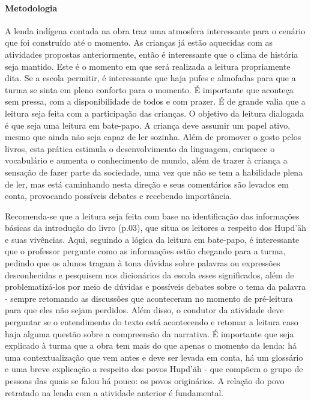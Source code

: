 \documentclass[11pt]{extarticle}
\begin{document}
\paragraph{Metodologia} A lenda indígena contada na obra traz uma atmosfera interessante para o cenário que foi construído até o momento. As crianças já estão aquecidas com as atividades propostas anteriormente, então é interessante que o clima de história seja mantido. Este é o momento em que será realizada a leitura propriamente dita. Se a escola permitir, é interessante que haja pufes e almofadas para que a turma se sinta em pleno conforto para o momento. É importante que aconteça sem pressa, com a disponibilidade de todos e com prazer. É de grande valia que a leitura seja feita com a participação das crianças. O objetivo da leitura dialogada é que seja uma leitura em bate-papo. A criança deve assumir um papel ativo, mesmo que ainda não seja capaz de ler sozinha. Além de promover o gosto pelos livros, esta prática estimula o desenvolvimento da linguagem, enriquece o vocabulário e aumenta o conhecimento de mundo, além de trazer à criança a sensação de fazer parte da sociedade, uma vez que não se tem a habilidade plena de ler, mas está caminhando nesta direção e seus comentários são levados em conta, provocando possíveis debates e recebendo importância. 



Recomenda-se que a leitura seja feita com base na identificação das informações básicas da introdução do livro (p.03), que situa os leitores a respeito dos Hupd'äh e suas vivências. Aqui, seguindo a lógica da leitura em bate-papo, é interessante que o professor pergunte como as informações estão chegando para a turma, pedindo que os alunos tragam à tona dúvidas sobre palavras ou expressões desconhecidas e pesquisem nos dicionários da escola esses significados, além de problematizá-los por meio de dúvidas e possíveis debates sobre o tema da palavra - sempre retomando as discussões que aconteceram no momento de pré-leitura para que eles não sejam perdidos. Além disso, o condutor da atividade deve perguntar se o entendimento do texto está acontecendo e retomar a leitura caso haja alguma questão sobre a compreensão da narrativa. É importante que seja explicado à turma que a obra tem mais do que apenas o momento da lenda: há uma contextualização que vem antes e deve ser levada em conta, há um glossário e uma breve explicação a respeito dos povos Hupd'äh - que compõem o grupo de pessoas das quais se falou há pouco: os povos originários. A relação do povo retratado na lenda com a atividade anterior é fundamental.
\end{document}
